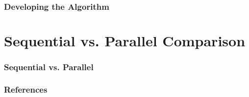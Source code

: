 \documentclass[13pt]{beamer}
\begin{document}
\begin{frame}
\frametitle{Developing the Algorithm}
  
\end{frame}

\section{Sequential vs. Parallel Comparison} %
\begin{frame}
\frametitle{Sequential vs. Parallel}
  
\end{frame}

 \begin{frame}
  \frametitle{References}
  \nocite{*} 
  
\end{frame}
\end{document}
